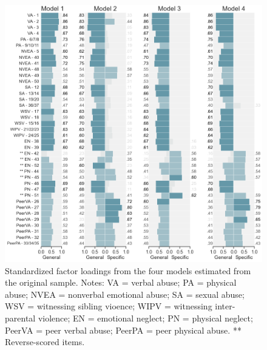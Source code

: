 \documentclass[letterpaper,man,natbib,floatsintext,longtable]{apa6}
\begin{document}
\begin{figure}[t!]
    \centering
    \includegraphics[width=1.1\textwidth,center]{figures/fig02.png}
    \captionsetup{width=1.1\textwidth}
    \caption{Standardized factor loadings from the four models estimated from the original sample. Notes: VA = verbal abuse; PA = physical abuse; NVEA = nonverbal emotional abuse; SA = sexual abuse; WSV = witnessing sibling vioence; WIPV = witnessing inter-parental violence; EN = emotional neglect; PN = physical neglect; PeerVA = peer verbal abuse; PeerPA = peer physical abuse.  ** Reverse-scored items.}
    \label{fig:loadings_original}
\end{figure}
\end{document}

